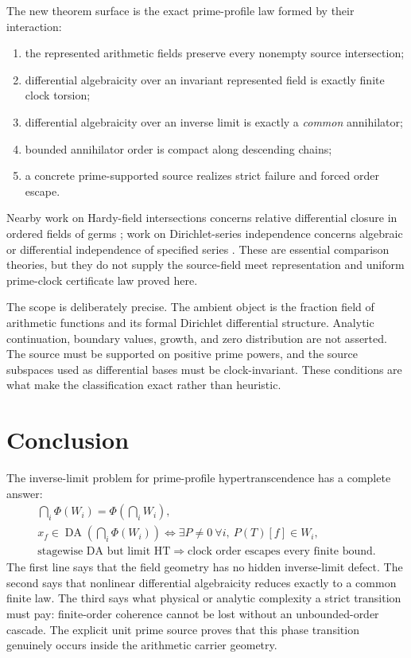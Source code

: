 \documentclass[11pt]{article}
\theoremstyle{definition}
\theoremstyle{remark}
\newcommand{\DA}{\operatorname{DA}}
\begin{document}
The new theorem surface is the exact prime-profile law formed by their interaction:
\begin{enumerate}
\item the represented arithmetic fields preserve every nonempty source intersection;
\item differential algebraicity over an invariant represented field is exactly finite clock
torsion;
\item differential algebraicity over an inverse limit is exactly a \emph{common} annihilator;
\item bounded annihilator order is compact along descending chains;
\item a concrete prime-supported source realizes strict failure and forced order escape.
\end{enumerate}
Nearby work on Hardy-field intersections concerns relative differential closure in ordered fields
of germs \cite{AschenbrennerVanDenDriesVanDerHoeven2025}; work on Dirichlet-series independence
concerns algebraic or differential independence of specified series
\cite{ShapiroSparer1986,Pong2016}.  These are essential comparison theories, but they do not supply
the source-field meet representation and uniform prime-clock certificate law proved here.

The scope is deliberately precise.  The ambient object is the fraction field of arithmetic
functions and its formal Dirichlet differential structure.  Analytic continuation, boundary
values, growth, and zero distribution are not asserted.  The source must be supported on positive
prime powers, and the source subspaces used as differential bases must be clock-invariant.  These
conditions are what make the classification exact rather than heuristic.

\section{Conclusion}

The inverse-limit problem for prime-profile hypertranscendence has a complete answer:
\[
\boxed{
\begin{gathered}
\bigcap_i\Phi(W_i)=\Phi(\bigcap_iW_i),\\[1mm]
x_f\in\DA(\bigcap_i\Phi(W_i))
\Longleftrightarrow
\exists P\ne0\ \forall i,\ P(T)[f]\in W_i,\\[1mm]
\text{stagewise DA but limit HT}
\Longrightarrow
\text{clock order escapes every finite bound}.
\end{gathered}}
\tag{10.1}
\]
The first line says that the field geometry has no hidden inverse-limit defect.  The second says
that nonlinear differential algebraicity reduces exactly to a common finite law.  The third says
what physical or analytic complexity a strict transition must pay: finite-order coherence cannot
be lost without an unbounded-order cascade.  The explicit unit prime source proves that this phase
transition genuinely occurs inside the arithmetic carrier geometry.
\end{document}
